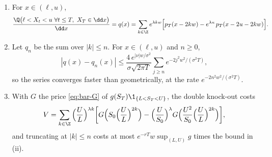 \begin{proposition}\label{prop:bar-double}
\begin{enumerate}[label=(\roman*)]
  \item For $x\in(\ell,u)$,
    \begin{equation}\label{eq:bar-double}
      \frac{\Q\big(\ell<X_t<u\ \forall t\le T,\ X_T\in\dd x\big)}{\dd x}
      =q(x)=\sum_{k\in\Z}e^{\lambda kw}\Big[p_T(x-2kw)-e^{\lambda u}\,p_T(x-2u-2kw)\Big].
    \end{equation}
  \item Let $q_n$ be the sum over $|k|\le n$. For $x\in(\ell,u)$ and $n\ge0$,
    \[
      |q(x)-q_n(x)|\le\frac{4\,e^{|\nu|w/\sigma^2}}{\sigma\sqrt{2\pi T}}\sum_{j\ge n}e^{-2j^2w^2/(\sigma^2T)},
    \]
    so the series converges faster than geometrically, at the rate $e^{-2n^2w^2/(\sigma^2T)}$.
  \item With $G$ the price \eqref{eq:bar-G} of $g(S_T)\1_{\{L<S_T<U\}}$, the double knock-out costs
    \[
      V=\sum_{k\in\Z}\Big(\frac UL\Big)^{\lambda k}\bigg[G\Big(S_0\Big(\frac UL\Big)^{2k}\Big)
      -\Big(\frac U{S_0}\Big)^{\lambda}G\Big(\frac{U^2}{S_0}\Big(\frac UL\Big)^{2k}\Big)\bigg],
    \]
    and truncating at $|k|\le n$ costs at most $e^{-rT}w\sup_{(L,U)}g$ times the bound in (ii).
\end{enumerate}
\end{proposition}

